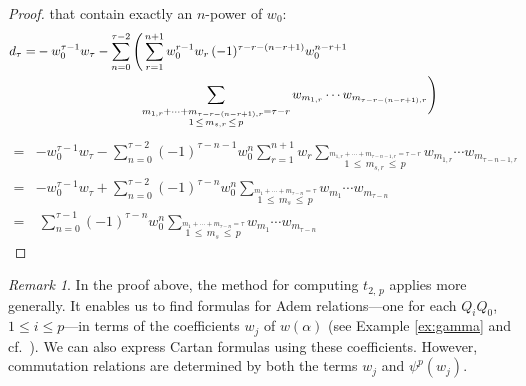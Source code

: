 \documentclass{gtpart}
\theoremstyle{definition}
\theoremstyle{remark}
\newtheorem{rmk}[equation]{Remark}
\newcommand{\A}{\alpha}
\newcommand{\T}{\tau}
\renewcommand{\=}{\approx}
\renewcommand{\-}{\sim}
\numberwithin{equation}{section}
\begin{document}
\begin{proof}
 that contain exactly an $n$-power of $w_0$: 
 \begin{equation*}
  \begin{split}
   d_\T = & -w_0^{\T - 1} w_\T - \sum_{n = 0}^{\T - 2} 
            \Bigg( \sum_{r = 1}^{n + 1} w_0^{r - 1} w_r \, 
            (-1)^{\T - r - (n - r + 1)} w_0^{n - r + 1} \\
          & \qquad\qquad\qquad\qquad\, \sum_{\stackrel{\scriptstyle m_{1,r} 
            + \cdots + m_{\T - r - (n - r + 1),r} = \T - r} 
            {1 \,\leq\, m_{s,r} \,\leq\, p}} w_{m_{1,r}} \cdots 
            w_{m_{\T - r - (n - r + 1),r}} \Bigg) \hskip 2cm
  \end{split}
 \end{equation*}
 \begin{equation*}
  \begin{split}
        = & -w_0^{\T - 1} w_\T - \sum_{n = 0}^{\T - 2} (-1)^{\T - n - 1} w_0^n 
            \sum_{r = 1}^{n + 1} w_r \sum_{\stackrel{\scriptstyle m_{1,r} 
            + \cdots + m_{\T - n - 1,r} = \T - r} 
            {1 \,\leq\, m_{s,r} \,\leq\, p}} w_{m_{1,r}} \cdots 
            w_{m_{\T - n - 1,r}} \\
        = & -w_0^{\T - 1} w_\T + \sum_{n = 0}^{\T - 2} (-1)^{\T - n} w_0^n 
            \sum_{\stackrel{\scriptstyle m_1 + \cdots + m_{\T - n} = \T} 
            {1 \,\leq\, m_s \,\leq\, p}} w_{m_1} \cdots w_{m_{\T - n}} \\
        = & ~ \sum_{n = 0}^{\T - 1} (-1)^{\T - n} w_0^n 
            \sum_{\stackrel{\scriptstyle m_1 + \cdots + m_{\T - n} = \T} 
            {1 \,\leq\, m_s \,\leq\, p}} w_{m_1} \cdots w_{m_{\T - n}} 
  \end{split}
 \end{equation*}
\end{proof}

\begin{rmk}
 \label{rmk:Adem}
 In the proof above, the method for computing $t_{2,\,p}$ applies more 
 generally.  It enables us to find formulas for Adem relations---one for each 
 $Q_i Q_0$, $1 \leq i \leq p$---in terms of the coefficients $w_j$ of $w(\A)$ 
 (see Example \ref{ex:gamma} and cf.~\cite[proof of Proposition 3.6\,(iv)]{p3}).  
 We can also express Cartan formulas using these coefficients.  However, 
 commutation relations are determined by both the terms $w_j$ and $\psi^p(w_j)$.  
\end{rmk}
\end{document}
